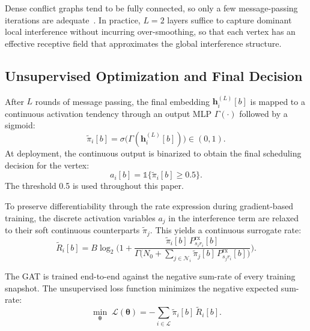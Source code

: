 \documentclass[letterpaper,journal]{IEEEtran}
\begin{document}
	Dense conflict graphs tend to be fully connected, so only a few message-passing iterations are adequate~\cite{gatUAVconf}. In practice, $L = 2$ layers suffice to capture dominant local interference without incurring over-smoothing, so that each vertex has an effective receptive field that approximates the global interference structure.
	
	\subsection{Unsupervised Optimization and Final Decision}
	\label{ssec:gat_output}
	
	After $L$ rounds of message passing, the final embedding $\mathbf{h}_i^{(L)}[b]$ is mapped to a continuous activation tendency through an output MLP $\Gamma(\cdot)$ followed by a sigmoid:
	\begin{equation}
		\tilde{\pi}_i[b] = \sigma\!\bigl( \Gamma(\mathbf{h}_i^{(L)}[b]) \bigr) \in (0, 1).
		\label{eq:gat_soft_output}
	\end{equation}
	At deployment, the continuous output is binarized to obtain the final scheduling decision for the vertex:
	\begin{equation}
		a_i[b] = \mathds{1}\!\bigl\{ \tilde{\pi}_i[b] \geq 0.5 \bigr\}.
		\label{eq:gat_binarize}
	\end{equation}
	The threshold 0.5 is used throughout this paper.
	
	To preserve differentiability through the rate expression during gradient-based training, the discrete activation variables $a_j$ in the interference term are relaxed to their soft continuous counterparts $\tilde{\pi}_j$. This yields a continuous surrogate rate:
	\begin{equation}
		\tilde{R}_i[b] = B \log_2\!\Biggl( 1 +
		\frac{\tilde{\pi}_i[b]\, P^{\mathrm{rx}}_{s_i r_i}[b]}
		{\Gamma \bigl( N_0
			+ \displaystyle\sum_{j \in \mathcal{N}_i}
			\tilde{\pi}_j[b]\, P^{\mathrm{rx}}_{s_j r_i}[b]
			\bigr)} \Biggr).
		\label{eq:gat_surrogate_rate}
	\end{equation}
	
	The GAT is trained end-to-end against the negative sum-rate of every training snapshot. The unsupervised loss function minimizes the negative expected sum-rate:
	\begin{equation}
		\min_{\boldsymbol{\theta}}\; \mathcal{L}(\boldsymbol{\theta}) = - \sum_{i \in \mathcal{L}} \tilde{\pi}_i[b]\, \tilde{R}_i[b].
		\label{eq:gat_loss}
	\end{equation}
	
\end{document}
